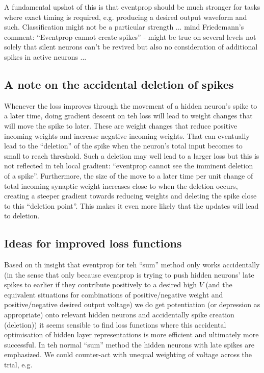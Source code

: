 \documentclass[a4paper]{article}
\begin{document}
A fundamental upshot of this is that eventprop should be much stronger for tasks where exact timing is required, e.g. producing a desired output waveform and such. Classification might not be a particular strength ... mind Friedemann's comment: ``Eventprop cannot create spikes'' - might be true on several levels not solely that silent neurons can't be revived but also no consideration of additional spikes in active neurons ...

\subsection{A note on the accidental deletion of spikes}
Whenever the loss improves through the movement of a hidden neuron's
spike to a later time, doing gradient descent on teh loss will lead to weight
changes that will move the spike to later. These are weight changes
that reduce positive incoming weights and increase negative incoming
weights. That can eventually lead to the ``deletion'' of the spike
when the neuron's total input becomes to small to reach
threshold. Such a deletion may well lead to a larger loss but this is
not reflected in teh local gradient: ``eventprop cannot see the
imminent deletion of a spike''. Furthermore, the size of the move to a later time
per unit change of total incoming synaptic weight increases close to
when the deletion occurs, creating a steeper gradient towards reducing
weights and deleting the spike close to this ``deletion point''. This
makes it even more likely that the updates will lead to deletion.

\subsection{Ideas for improved loss functions}
Based on th insight that eventprop for teh ``sum'' method only works
accidentally (in the sense that only because eventprop is trying to
push hidden neurons' late spikes to earlier if they contribute
positively to a desired high $V$ (and the equivalent situations for
combinations of positive/negative weight and positive/negative desired
output voltage) we do get potentiation (or depression as appropriate)
onto relevant hidden neurons and accidentally spike creation
(deletion)) it seems sensible to find loss functions where this
accidental optimisation of hidden layer representations is more
efficient and ultimately more successful. In teh normal ``sum'' method
the hidden neurons with late spikes are emphasized. We could
counter-act with unequal weighting of voltage across the trial, e.g.
\begin{align}
\end{align}
\end{document}
